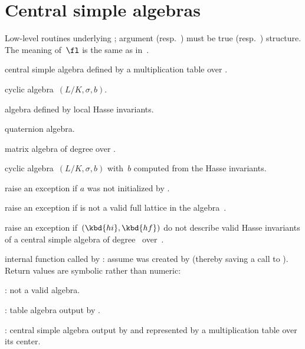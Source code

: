 \section{Central simple algebras}


Low-level routines underlying ; argument  (resp.~)
must be true  (resp.~) structure. The meaning of~$\fl$ is the
same as in~.

central simple algebra defined by a multiplication table over .

cyclic algebra~$(L/K,\sigma,b)$.

algebra defined by local Hasse invariants.

quaternion algebra.

matrix algebra of degree  over .

cyclic algebra~$(L/K,\sigma,b)$ with~$b$ computed from the Hasse invariants.


 raise an exception if $a$ was not initialized
by .

 raise an exception if  is not a
valid full lattice in the algebra~.

 raise an exception
if~$(\kbd{hi},\kbd{hf})$ do not describe valid Hasse invariants of a central
simple algebra of degree~ over~.

 internal function called by : assume
 was created by  (thereby saving a call to ).
Return values are symbolic rather than numeric:

\item {}: not a valid algebra.

\item {}: table algebra output by .

\item {}: central simple algebra output by  and
represented by a multiplication table over its center.

